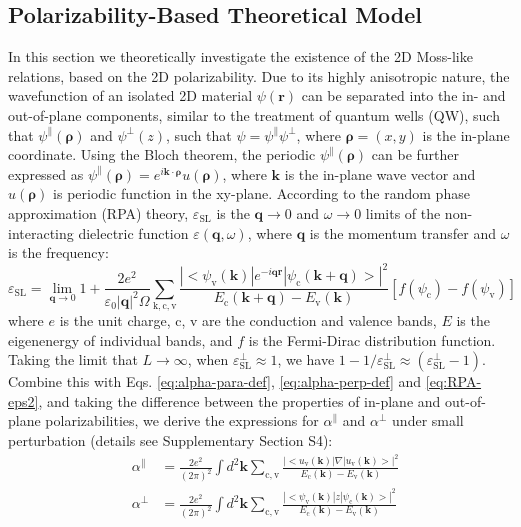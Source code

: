 \documentclass[journal=ancac3,manuscript=article,email=true,hyperref=true,keywords=false]{achemso}
\begin{document}
\subsection{Polarizability-Based Theoretical Model}
In this section we theoretically investigate the existence of the 2D
Moss-like relations, based on the 2D polarizability.  Due to its
highly anisotropic nature, the wavefunction of an isolated 2D material
$\psi(\mathbf{r})$ can be separated into the in- and out-of-plane
components, similar to the treatment of quantum wells
(QW),\cite{davies_physics_1997} such that
$\psi^{\parallel}(\boldsymbol{\rho})$ and $\psi^{\perp}(z)$, such that
$\psi=\psi^{\parallel}\psi^{\perp}$, where $\boldsymbol{\rho}=(x, y)$
is the in-plane coordinate. Using the Bloch theorem, the periodic
$\psi^{\parallel}(\boldsymbol{\rho})$ can be further expressed as
$\psi^{\parallel}(\boldsymbol{\rho})=e^{i\mathbf{k} \cdot
  \boldsymbol{\rho}}u(\boldsymbol{\rho})$, where $\mathbf{k}$ is the
in-plane wave vector and $u(\boldsymbol{\rho})$ is periodic function
in the xy-plane. According to the random phase approximation (RPA)
theory\cite{Adler_1962}, $\varepsilon_{\mathrm{SL}}$ is the
$\mathbf{q} \to 0$ and $\omega \to 0$ limits of the non-interacting
dielectric function $\varepsilon(\mathbf{q}, \omega)$, where
$\mathbf{q}$ is the momentum transfer and $\omega$ is the frequency:
\begin{equation}
  \label{eq:RPA-eps2}
  \varepsilon_{\mathrm{SL}}
  = \lim_{\mathbf{q} \to 0} 1 + \frac{2e^{2}}{\varepsilon_{0} |\mathbf{q}|^{2} \Omega}
  \sum_{\mathrm{k, c, v}}
  \frac{|<\psi_{\mathrm{v}}(\mathbf{k})|e^{-i\mathbf{q}\mathbf{r}}|\psi_{\mathrm{c}}(\mathbf{k+q})>|^{2}}
  {E_{\mathrm{c}}(\mathbf{k+q}) - E_{\mathrm{v}}(\mathbf{k})}
  \left[f(\psi_{\mathrm{c}}) - f(\psi_{\mathrm{v}})\right]
\end{equation}
where $e$ is the unit charge, c, v are the conduction and valence
bands, $E$ is the eigenenergy of individual bands, and $f$ is the
Fermi-Dirac distribution function. Taking the limit that $L\to\infty$,
when $\varepsilon^{\perp}_{\mathrm{SL}} \approx 1$, we have
$1-1/\varepsilon^{\perp}_{\mathrm{SL}} \approx
(\varepsilon_{\mathrm{SL}}^{\perp} - 1)$. Combine this with
Eqs. \ref{eq:alpha-para-def}, \ref{eq:alpha-perp-def} and
\ref{eq:RPA-eps2}, and taking the difference between the properties of
in-plane and out-of-plane polarizabilities, we derive the expressions
for $\alpha^{\parallel}$ and $\alpha^{\perp}$ under small perturbation
(details see Supplementary Section S4):
\begin{subequations}
  \begin{eqnarray}
  \label{eq:alpha_para_RPA}
  & \alpha^{\parallel} &= \frac{2e^{2}}
  {(2 \pi)^{2}} \int d^{2}\mathbf{k} \sum_{\mathrm{c, v}}
  \frac{|<u_{\mathrm{v}}(\mathbf{k})|\nabla|u_{\mathrm{v}}(\mathbf{k})>|^{2}}
                         {E_{\mathrm{c}}(\mathbf{k}) - E_{\mathrm{v}}(\mathbf{k})} \\
  \label{eq:alpha_perp_RPA}
  & \alpha^{\perp} &= \frac{2e^{2}}{(2 \pi) ^{2}} \int d^{2}\mathbf{k}
  \sum_{\mathrm{c, v}}
  \frac{|<\psi_{\mathrm{v}}(\mathbf{k})|z|\psi_{\mathrm{c}}(\mathbf{k})>|^{2}}
  {E_{\mathrm{c}}(\mathbf{k}) - E_{\mathrm{v}}(\mathbf{k})}
  \end{eqnarray}
\end{subequations}
\end{document}
